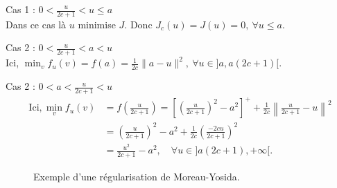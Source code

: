 \documentclass[main.tex]{subfiles}
\begin{document}
\begin{myitemize}
\renewcommand{\labelitemi}{\scriptsize$\bullet$} 
\item Cas 1 : $0 < \frac{u}{2c+1} < u \leq a$\\ %
Dans ce cas là $u$ minimise $J$. Donc $J_c(u)=J(u)=0, \ \forall u \leq a$.

\item Cas 2 : $0 < \frac{u}{2c+1} < a < u \qquad$ 
\\
Ici, $\min_v f_u(v) = f(a) = \frac{1}{2c} \| a-u\|^2, \ \forall u \in ]a,a(2c+1)[.$
\item Cas 2 : $0 < a < \frac{u}{2c+1} < u \qquad$ 
\\
\begin{align*}
\textrm{Ici}, \min_v f_u(v) &= f\left( \frac{u}{2c+1} \right) = \left[ \left( \frac{u}{2c+1} \right)^2 -a^2 \right]^+ + \frac{1}{2c} \left\| \frac{u}{2c+1}-u \right\|^2 \\
& = \left( \frac{u}{2c+1} \right)^2 -a^2 + \frac{1}{2c} \left( \frac{-2cu}{2c+1} \right)^2 \\
& = \frac{u^2}{2c+1} -a^2, \quad \forall u \in ]a(2c+1),+\infty[.
\end{align*}
\end{myitemize}
\begin{figure}
\centering
{} 
\caption{\label{fig:regul_yosida} Exemple d'une régularisation de Moreau-Yosida.}
\end{figure}
\end{document}
